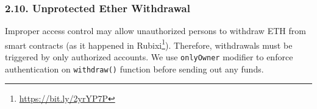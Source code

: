 \subsubsection*{2.10. Unprotected Ether Withdrawal}
Improper access control may allow unauthorized persons to withdraw ETH from smart contracts (as it happened in Rubixi\footnote{\url{https://bit.ly/2yrYP7P}}). Therefore, withdrawals must be triggered by only authorized accounts. We use \texttt{onlyOwner} modifier to enforce authentication on \texttt{withdraw()} function before sending out any funds.